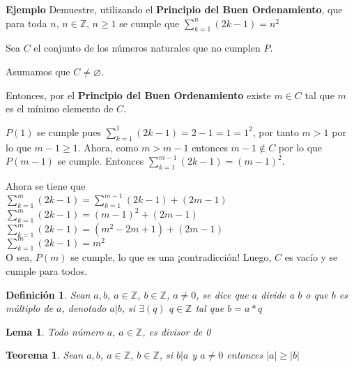 \documentclass[a4paper,1pt]{report}
\newtheorem*{teo}{Teorema}
\newtheorem*{dfn}{Definición}
\newtheorem*{lem}{Lema}
\begin{document}


\textbf{Ejemplo}
Demuestre, utilizando el \textbf{Principio del Buen Ordenamiento}, que para toda $n$, $n\in\mathbb{Z}$, $n\geq 1$ se cumple que $\sum^n_{k=1}(2k-1)=n^2$

Sea $C$ el conjunto de los números naturales que no cumplen $P$. 

Asumamos que $C\neq \varnothing$.

Entonces, por el \textbf{Principio del Buen Ordenamiento} existe $m\in C$ tal que $m$ es el mínimo elemento de $C$.

$P(1)$ se cumple pues $\sum^1_{k=1}(2k-1)=2-1=1=1^2$, por tanto $m>1$ por lo que $m-1\geq1$. Ahora, como $m > m-1$ entonces $m-1\notin C$ por lo que $P(m-1)$ se cumple. Entonces $\sum^{m-1}_{k=1}(2k-1)=(m-1)^2$.

Ahora se tiene que\\ 
$\sum^m_{k=1}(2k-1)=\sum^{m-1}_{k=1}(2k-1)+(2m-1)$\\
$\sum^m_{k=1}(2k-1)=(m-1)^2+(2m-1)$\\
$\sum^m_{k=1}(2k-1)=(m^2-2m+1)+(2m-1)$\\
$\sum^m_{k=1}(2k-1)=m^2$\\
O sea, $P(m)$ se cumple, lo que es una ¡contradicción! Luego, $C$ es vacío y se cumple para todos.

\begin{dfn}
 Sean $a,b$, $a\in\mathbb{Z}$, $b\in\mathbb{Z}$, $a\neq 0$, se dice que $a$ divide a $b$ o que $b$ es múltiplo de $a$, denotado $a|b$, si $\exists(q)$ $q\in\mathbb{Z}$ tal que $b=a*q$
\end{dfn}

\begin{lem}
 Todo número $a$, $a\in\mathbb{Z}$, es divisor de 0
\end{lem}

\begin{teo}
 Sean $a,b$, $a\in\mathbb{Z}$, $b\in\mathbb{Z}$, si $b|a$ y $a\neq 0$ entonces $|a| \geq |b|$
\end{teo}
\end{document}

